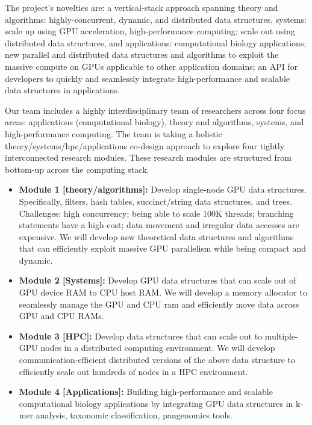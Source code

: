 The project’s novelties are: a vertical-stack approach spanning theory and
algorithms: highly-concurrent, dynamic, and distributed data structures,
systems: scale up using GPU acceleration, high-performance computing: scale out
using distributed data structures, and applications: computational biology
applications; new parallel and distributed data structures and algorithms to
exploit the massive compute on GPUs applicable to other application domains; an
API for developers to quickly and seamlessly integrate high-performance and
scalable data structures in applications.

Our team includes a highly interdisciplinary team of researchers across four
focus areas: applications (computational biology), theory and algorithms,
systems, and high-performance computing. The team is taking a holistic
theory/systems/hpc/applications co-design approach to explore four tightly
interconnected research modules.
These research modules are structured from bottom-up across the computing stack.

\begin{itemize}[noitemsep, leftmargin=*]
  \item {\bf Module 1 [theory/algorithms]:} Develop single-node GPU data structures.
    Specifically, filters, hash tables, succinct/string data structures, and
    trees. Challenges: high concurrency; being able to scale 100K threads;
    branching statements have a high cost; data movement and irregular data
    accesses are expensive. We will develop new theoretical data structures and
    algorithms that can efficiently exploit massive GPU parallelism while being
    compact and dynamic.

  \item {\bf Module 2 [Systems]:} Develop GPU data structures that can scale out of
      GPU device RAM to CPU host RAM. We will develop a memory allocator to
      seamlessly manage the GPU and CPU ram and efficiently move data across GPU
      and CPU RAMs.

    \item {\bf Module 3 [HPC]:} Develop data structures that can scale out to
      multiple-GPU nodes in a distributed computing environment. We will develop
      communication-efficient distributed versions of the above data structure
      to efficiently scale out hundreds of nodes in a HPC environment.

    \item {\bf Module 4 [Applications]:} Building high-performance and scalable
      computational biology applications by integrating GPU data structures in
      k-mer analysis, taxonomic classification, pangenomics tools.

\end{itemize}

